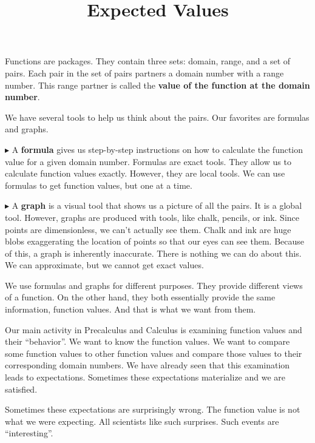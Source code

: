 \documentclass{ximera}
\title{Expected Values}
\begin{document}
\begin{abstract}

\end{abstract}
\maketitle




Functions are packages.  They contain three sets: domain, range, and a set of pairs.  Each pair in the set of pairs partners a domain number with a range number.  This range partner is called the \textbf{value of the function \textcolor{purple!85!blue}{at} the domain number}.


We have several tools to help us think about the pairs. Our favorites are formulas and graphs. 


$\blacktriangleright$ A \textbf{\textcolor{purple!85!blue}{formula}} gives us step-by-step instructions on how to calculate the function value for a given domain number.   Formulas are exact tools. They allow us to calculate function values exactly. However, they are local tools.  We can use formulas to get function values, but one at a time.


$\blacktriangleright$ A \textbf{\textcolor{purple!85!blue}{graph}} is a visual tool that shows us a picture of all the pairs.  It is a global tool. However, graphs are produced with tools, like chalk, pencils, or ink.  Since points are dimensionless, we can't actually see them. Chalk and ink are huge blobs exaggerating the location of points so that our eyes can see them.  Because of this, a graph is inherently inaccurate.  There is nothing we can do about this. We can approximate, but we cannot get exact values.  


We use formulas and graphs for different purposes. They provide different views of a function.  On the other hand, they both essentially provide the same information, function values. And that is what we want from them.


Our main activity in Precalculus and Calculus is examining function values and their ``behavior''.  We want to know the function values.  We want to compare some function values to other function values and compare those values to their corresponding domain numbers.  We have already seen that this examination leads to expectations.  Sometimes these expectations materialize and we are satisfied.  

Sometimes these expectations are surprisingly wrong.  The function value is not what we were expecting. All scientists like such surprises. Such events are ``interesting''. 
\end{document}
